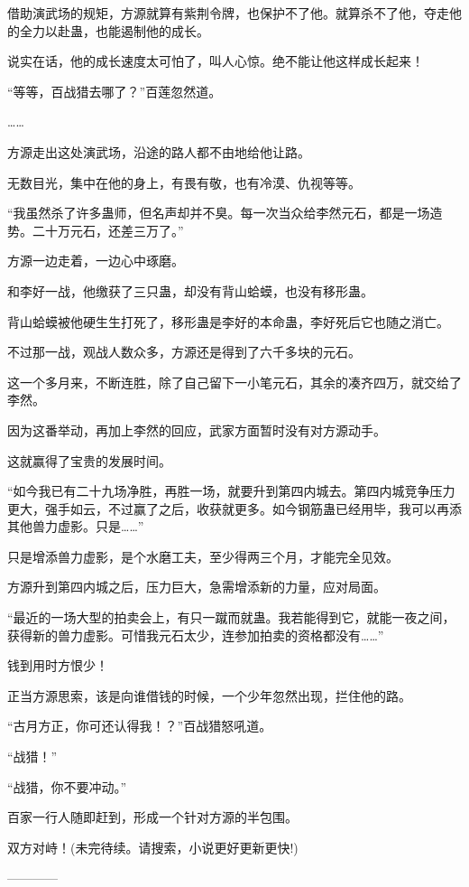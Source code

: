 \begin{this_body}
借助演武场的规矩，方源就算有紫荆令牌，也保护不了他。就算杀不了他，夺走他的全力以赴蛊，也能遏制他的成长。

说实在话，他的成长速度太可怕了，叫人心惊。绝不能让他这样成长起来！

“等等，百战猎去哪了？”百莲忽然道。

……

方源走出这处演武场，沿途的路人都不由地给他让路。

无数目光，集中在他的身上，有畏有敬，也有冷漠、仇视等等。

“我虽然杀了许多蛊师，但名声却并不臭。每一次当众给李然元石，都是一场造势。二十万元石，还差三万了。”

方源一边走着，一边心中琢磨。

和李好一战，他缴获了三只蛊，却没有背山蛤蟆，也没有移形蛊。

背山蛤蟆被他硬生生打死了，移形蛊是李好的本命蛊，李好死后它也随之消亡。

不过那一战，观战人数众多，方源还是得到了六千多块的元石。

这一个多月来，不断连胜，除了自己留下一小笔元石，其余的凑齐四万，就交给了李然。

因为这番举动，再加上李然的回应，武家方面暂时没有对方源动手。

这就赢得了宝贵的发展时间。

“如今我已有二十九场净胜，再胜一场，就要升到第四内城去。第四内城竞争压力更大，强手如云，不过赢了之后，收获就更多。如今钢筋蛊已经用毕，我可以再添其他兽力虚影。只是……”

只是增添兽力虚影，是个水磨工夫，至少得两三个月，才能完全见效。

方源升到第四内城之后，压力巨大，急需增添新的力量，应对局面。

“最近的一场大型的拍卖会上，有只一蹴而就蛊。我若能得到它，就能一夜之间，获得新的兽力虚影。可惜我元石太少，连参加拍卖的资格都没有……”

钱到用时方恨少！

正当方源思索，该是向谁借钱的时候，一个少年忽然出现，拦住他的路。

“古月方正，你可还认得我！？”百战猎怒吼道。

“战猎！”

“战猎，你不要冲动。”

百家一行人随即赶到，形成一个针对方源的半包围。

双方对峙！(未完待续。请搜索，小说更好更新更快!)

------------

\end{this_body}

